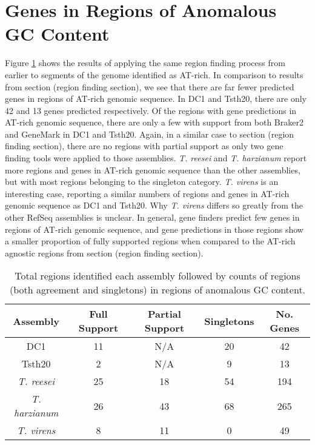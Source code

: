 \section{Genes in Regions of Anomalous GC Content}

Figure \ref{table:gc-regions} shows the results of applying the same
region finding process from earlier to segments of the genome
identified as AT-rich. In comparison to results from section (region
finding section), we see that there are far fewer predicted genes in
regions of AT-rich genomic sequence. In DC1 and Tsth20, there are only
42 and 13 genes predicted respectively. Of the regions with gene
predictions in AT-rich genomic sequence, there are only a few with
support from both Braker2 and GeneMark in DC1 and Tsth20. Again, in a
similar case to section (region finding section), there are no regions
with partial support as only two gene finding tools were applied to
those assemblies. \textit{T. reesei} and \textit{T. harzianum} report
more regions and genes in AT-rich genomic sequence than the other
assemblies, but with most regions belonging to the singleton
category. \textit{T. virens} is an interesting case, reporting a
similar numbers of regions and genes in AT-rich genomic sequence as
DC1 and Tsth20. Why \textit{T. virens} differs so greatly from the
other RefSeq assemblies is unclear. In general, gene finders predict
few genes in regions of AT-rich genomic sequence, and gene predictions
in those regions show a smaller proportion of fully supported regions
when compared to the AT-rich agnostic regions from section (region
finding section).

\begin{table}
  \begin{center}
    \begin{tabular}{|c|c|c|c|c|}
      \hline
      Assembly & Full Support & Partial Support & Singletons & No. Genes \\ \hline
      DC1 & 11 & N/A & 20 & 42  \\ \hline
      Tsth20 & 2 & N/A & 9 & 13  \\ \hline
      \textit{T. reesei} & 25 & 18 & 54 & 194  \\ \hline
      \textit{T. harzianum} & 26 & 43 & 68 & 265  \\ \hline
      \textit{T. virens} & 8 & 11 & 0 & 49  \\ \hline
    \end{tabular}
  \end{center}
  \caption[Agreement of predictions in anomalous GC regions.]{Total
    regions identified each assembly followed by counts of regions
    (both agreement and singletons) in regions of anomalous GC
    content.}
  \label{table:gc-regions}
\end{table}

